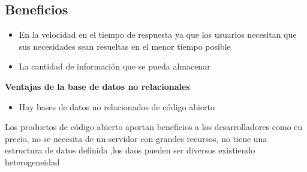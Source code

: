\documentclass[12pt]{article}
\begin{document}
\begin{multicols}{2}

\par


\vspace{\baselineskip}

\vspace{\baselineskip}
\section*{Beneficios}

\par

\begin{itemize}
	\item {\fontsize{9pt}{10.8pt}\selectfont En la velocidad en el tiempo de respuesta ya que los usuarios necesitan que sus necesidades sean resueltas en el menor tiempo posible\par}\par

	\item {\fontsize{9pt}{10.8pt}\selectfont La cantidad de información que se pueda almacenar\par}
\end{itemize}\par


\vspace{\baselineskip}
{\fontsize{9pt}{10.8pt}\selectfont \textbf{Ventajas de la base de datos no relacionales}\par}\par

\begin{itemize}
	\item {\fontsize{9pt}{10.8pt}\selectfont Hay bases de datos no relacionados de código abierto\par}
\end{itemize}\par

{\fontsize{9pt}{10.8pt}\selectfont Los productos de código abierto aportan beneficios a los desarrolladores como en precio, no se necesita de un servidor con grandes recursos, no tiene una estructura de datos definida ,los daos pueden ser diversos existiendo heterogeneidad\par}\par


\end{multicols}
\end{document}
